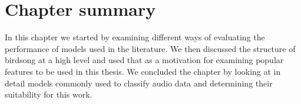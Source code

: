 \section{Chapter summary}

In this chapter we started by examining different ways of evaluating the
performance of models used in the literature. We then discussed the structure of
birdsong at a high level and used that as a motivation for examining popular
features to be used in this thesis. We concluded the chapter by looking at in
detail models commonly used to classify audio data and determining their
suitability for this work.
